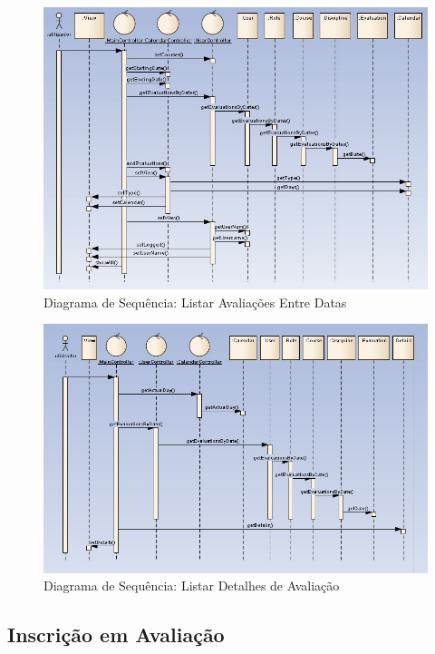 \begin{figure}[!htbp]
\centering
\includegraphics[width=17cm]{imagens/listar_entre_datas.jpg}
\caption{Diagrama de Sequência: Listar Avaliações Entre Datas}
\label{fig:listar_entre_datas}
\end{figure}

\begin{figure}[!htbp]
\centering
\includegraphics[width=17cm]{imagens/listar_detalhes.jpg}
\caption{Diagrama de Sequência: Listar Detalhes de Avaliação}
\label{fig:listar_detalhes}
\end{figure}



\clearpage
\subsection{Inscrição em Avaliação}

